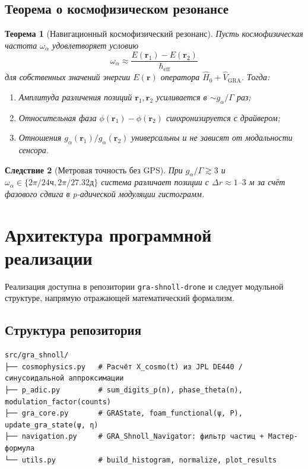 \documentclass[12pt,a4paper]{article}
\newcommand{\GRA}{\text{GRA}}
\newcommand{\eff}{\text{eff}}
\theoremstyle{plain}
\newtheorem{theorem}{Теорема}[section]
\newtheorem{corollary}[theorem]{Следствие}
\theoremstyle{definition}
\begin{document}
\subsection{Теорема о космофизическом резонансе}
\begin{theorem}[Навигационный космофизический резонанс]
\label{thm:resonance}
Пусть космофизическая частота $\omega_\alpha$ удовлетворяет условию
\begin{equation}
\omega_\alpha \approx \frac{E(\mathbf{r}_1) - E(\mathbf{r}_2)}{\hbar_{\eff}}
\label{eq:res-cond}
\end{equation}
для собственных значений энергии $E(\mathbf{r})$ оператора $\hat{H}_0 + \hat{V}_{\GRA}$. Тогда:
\begin{enumerate}
    \item Амплитуда различения позиций $\mathbf{r}_1, \mathbf{r}_2$ усиливается в $\sim g_\alpha/\Gamma$ раз;
    \item Относительная фаза $\phi(\mathbf{r}_1) - \phi(\mathbf{r}_2)$ синхронизируется с драйвером;
    \item Отношения $g_\alpha(\mathbf{r}_1)/g_\alpha(\mathbf{r}_2)$ универсальны и не зависят от модальности сенсора.
\end{enumerate}
\end{theorem}

\begin{corollary}[Метровая точность без GPS]
При $g_\alpha/\Gamma \gtrsim 3$ и $\omega_\alpha \in \{2\pi/24\text{ч}, 2\pi/27.32\text{д}\}$ система различает позиции с $\Delta r \approx 1$--$3$ м за счёт фазового сдвига в p-адической модуляции гистограмм.
\end{corollary}

\section{Архитектура программной реализации}
\label{sec:implementation}

Реализация доступна в репозитории \texttt{gra-shnoll-drone} и следует модульной структуре, напрямую отражающей математический формализм.

\subsection{Структура репозитория}
\begin{verbatim}
src/gra_shnoll/
├── cosmophysics.py   # Расчёт X_cosmo(t) из JPL DE440 / синусоидальной аппроксимации
├── p_adic.py         # sum_digits_p(n), phase_theta(n), modulation_factor(counts)
├── gra_core.py       # GRAState, foam_functional(ψ, P), update_gra_state(ψ, η)
├── navigation.py     # GRA_Shnoll_Navigator: фильтр частиц + Мастер-формула
└── utils.py          # build_histogram, normalize, plot_results
\end{verbatim}
\end{document}
